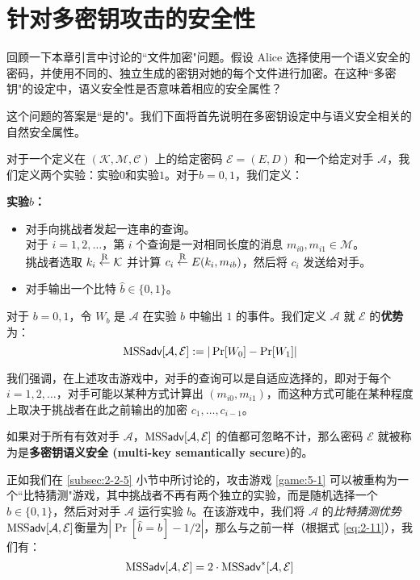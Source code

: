 \section{针对多密钥攻击的安全性}\label{sec:5-2}

回顾一下本章引言中讨论的``文件加密"问题。假设 Alice 选择使用一个语义安全的密码，并使用不同的、独立生成的密钥对她的每个文件进行加密。在这种``多密钥"的设定中，语义安全性是否意味着相应的安全属性？

这个问题的答案是``是的"。我们下面将首先说明在多密钥设定中与语义安全相关的自然安全属性。

\begin{game}[多密钥语义安全性]\label{game:5-1}
对于一个定义在 $(\mathcal{K},\mathcal{M},\mathcal{C})$ 上的给定密码 $\mathcal{E}=(E,D)$ 和一个给定对手 $\mathcal{A}$，我们定义两个实验：实验$0$和实验$1$。对于$b=0,1$，我们定义：

\noindent\textbf{实验$b$：}
\begin{itemize}
	\item 对手向挑战者发起一连串的查询。\\
	对于 $i=1,2,\dots$，第 $i$ 个查询是一对相同长度的消息 $m_{i0},m_{i1}\in\mathcal{M}$。\\
	挑战者选取 $k_i\overset{\rm R}\leftarrow\mathcal{K}$ 并计算 $c_i\overset{\rm R}\leftarrow E(k_i,m_{ib})$，然后将 $c_i$ 发送给对手。
	\item 对手输出一个比特 $\hat{b}\in\{0,1\}$。
\end{itemize}

对于 $b=0,1$，令 $W_b$ 是 $\mathcal{A}$ 在实验 $b$ 中输出 $1$ 的事件。我们定义 $\mathcal{A}$ 就 $\mathcal{E}$ 的\textbf{优势}为：
\[
{\rm MSS}\mathsf{adv}[\mathcal{A},\mathcal{E}]:=|\Pr[W_0]-\Pr[W_1]|
\]
\end{game}

我们强调，在上述攻击游戏中，对手的查询可以是自适应选择的，即对于每个 $i=1,2,\dots$，对手可能以某种方式计算出 $(m_{i0},m_{i1})$，而这种方式可能在某种程度上取决于挑战者在此之前输出的加密 $c_1,\dots,c_{i-1}$。

\begin{definition}[多密钥语义安全性]\label{def:5-1}
如果对于所有有效对手 $\mathcal{A}$，${\rm MSS}\mathsf{adv}[\mathcal{A},\mathcal{E}]$ 的值都可忽略不计，那么密码 $\mathcal{E}$ 就被称为是\textbf{多密钥语义安全 (multi-key semantically secure)}的。
\end{definition}

正如我们在 \ref{subsec:2-2-5} 小节中所讨论的，攻击游戏 \ref{game:5-1} 可以被重构为一个``比特猜测"游戏，其中挑战者不再有两个独立的实验，而是随机选择一个 ${b}\in\{0,1\}$，然后对对手 $\mathcal{A}$ 运行实验 $b$。在该游戏中，我们将 $\mathcal{A}$ 的\emph{比特猜测优势}${\rm MSS}\mathsf{adv}[\mathcal{A},\mathcal{E}]$衡量为$|\Pr[\hat{b}=b]-{1}/{2}|$，那么与之前一样（根据式 \ref{eq:2-11}），我们有：
\begin{equation}\label{eq:5-1}
{\rm MSS}\mathsf{adv}[\mathcal{A},\mathcal{E}]= 2\cdot{\rm MSS}\mathsf{adv}^*[\mathcal{A},\mathcal{E}]
\end{equation}

